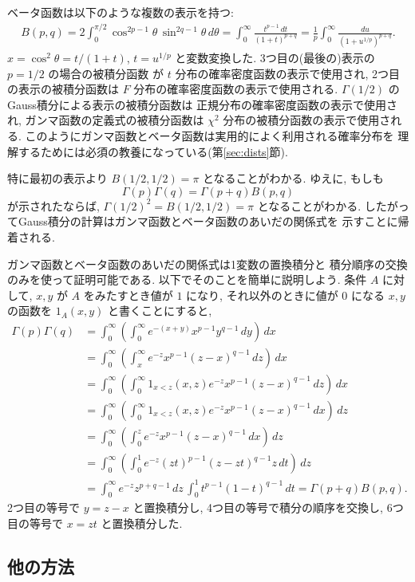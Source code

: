 \documentclass[12pt,twoside]{jarticle}
\theoremstyle{jplain}
\theoremstyle{jplain}
\theoremstyle{jplain}
\numberwithin{theorem}{section}
\numberwithin{equation}{section}
\numberwithin{figure}{section}
\numberwithin{table}{section}
\newcommand\secref[1]{第\ref{#1}節}
\begin{document}
ベータ函数は以下のような複数の表示を持つ:
\begin{align*}
B(p,q)
=2\int_0^{\pi/2} \cos^{2p-1}\theta\,\sin^{2q-1}\theta\,d\theta
=\int_0^\infty \frac{t^{p-1}\,dt}{(1+t)^{p+q}}
=\frac{1}{p}\int_0^\infty \frac{du}{(1+u^{1/p})^{p+q}}.
\end{align*}
$x=\cos^2\theta=t/(1+t)$, $t=u^{1/p}$ と変数変換した.
3つ目の(最後の)表示の $p=1/2$ の場合の被積分函数
が $t$ 分布の確率密度函数の表示で使用され,
2つ目の表示の被積分函数は $F$ 分布の確率密度函数の表示で使用される.
$\Gamma(1/2)$ のGauss積分による表示の被積分函数は
正規分布の確率密度函数の表示で使用され,
ガンマ函数の定義式の被積分函数は $\chi^2$ 分布の被積分函数の表示で使用される.
このようにガンマ函数とベータ函数は実用的によく利用される確率分布を
理解するためには必須の教養になっている(\secref{sec:dists}).

特に最初の表示より $B(1/2,1/2)=\pi$ となることがわかる.
ゆえに, もしも
\[
\Gamma(p)\Gamma(q)=\Gamma(p+q)B(p,q)
\]
が示されたならば, $\Gamma(1/2)^2=B(1/2,1/2)=\pi$ となることがわかる.
したがってGauss積分の計算はガンマ函数とベータ函数のあいだの関係式を
示すことに帰着される.

ガンマ函数とベータ函数のあいだの関係式は1変数の置換積分と
積分順序の交換のみを使って証明可能である.
以下でそのことを簡単に説明しよう.
条件 $A$ に対して, $x,y$ が $A$ をみたすとき値が $1$ になり,
それ以外のときに値が $0$ になる $x,y$ の函数を $1_A(x,y)$ と書くことにすると,
\begin{align*}
\Gamma(p)\Gamma(q)
&=
\int_0^\infty
\left(
\int_0^\infty e^{-(x+y)} x^{p-1} y^{q-1}\,dy
\right)\,dx
\\ &
=
\int_0^\infty
\left(
\int_x^\infty e^{-z} x^{p-1} (z-x)^{q-1}\,dz
\right)\,dx
\\ &
=
\int_0^\infty
\left(
\int_0^\infty 1_{x<z}(x,z) e^{-z} x^{p-1} (z-x)^{q-1}\,dz
\right)\,dx
\\ &
=
\int_0^\infty
\left(
\int_0^\infty 1_{x<z}(x,z) e^{-z} x^{p-1} (z-x)^{q-1}\,dx
\right)\,dz
\\ &
=
\int_0^\infty
\left(
\int_0^z e^{-z} x^{p-1} (z-x)^{q-1}\,dx
\right)\,dz
\\ &
=
\int_0^\infty
\left(
\int_0^1 e^{-z} (zt)^{p-1} (z-zt)^{q-1}z\,dt
\right)\,dz
\\ &
=\int_0^\infty e^{-z}z^{p+q-1}\,dz
\,\int_0^1 t^{p-1}(1-t)^{q-1}\,dt
=\Gamma(p+q)B(p,q).
\end{align*}
2つ目の等号で $y=z-x$ と置換積分し,
4つ目の等号で積分の順序を交換し,
6つ目の等号で $x=zt$ と置換積分した.


\subsection{他の方法}
\end{document}
